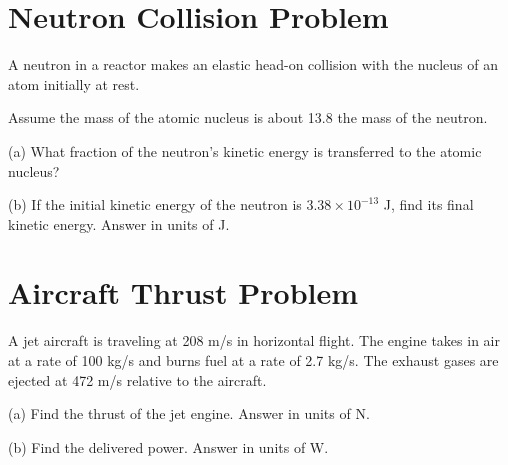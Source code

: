 \documentclass[../physics12.tex]{subfiles}
\begin{document}
\section{Neutron Collision Problem}
A neutron in a reactor makes an elastic head-on collision with the nucleus of an atom initially at rest.

Assume the mass of the atomic nucleus is about 13.8 the mass of the neutron.

(a) What fraction of the neutron's kinetic energy is transferred to the atomic nucleus?

(b) If the initial kinetic energy of the neutron is $3.38\times 10^{-13}$ J, find its final kinetic energy.
Answer in units of J.

\section{Aircraft Thrust Problem}
A jet aircraft is traveling at 208 m/s in horizontal flight. The engine takes in air at a rate of 100 kg/s and burns fuel at a rate of 2.7 kg/s.
The exhaust gases are ejected at 472 m/s relative to the aircraft.

(a) Find the thrust of the jet engine.
Answer in units of N.

(b) Find the delivered power.
Answer in units of W.
\end{document}
